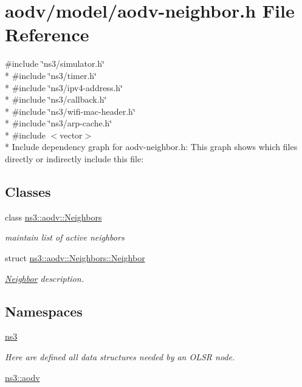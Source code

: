 \hypertarget{aodv-neighbor_8h}{}\section{aodv/model/aodv-\/neighbor.h File Reference}
\label{aodv-neighbor_8h}
{\ttfamily \#include \char`\"{}ns3/simulator.\+h\char`\"{}}\\*
{\ttfamily \#include \char`\"{}ns3/timer.\+h\char`\"{}}\\*
{\ttfamily \#include \char`\"{}ns3/ipv4-\/address.\+h\char`\"{}}\\*
{\ttfamily \#include \char`\"{}ns3/callback.\+h\char`\"{}}\\*
{\ttfamily \#include \char`\"{}ns3/wifi-\/mac-\/header.\+h\char`\"{}}\\*
{\ttfamily \#include \char`\"{}ns3/arp-\/cache.\+h\char`\"{}}\\*
{\ttfamily \#include $<$vector$>$}\\*
Include dependency graph for aodv-\/neighbor.h\+:
This graph shows which files directly or indirectly include this file\+:
\subsection*{Classes}
\begin{DoxyCompactItemize}
\item 
class \hyperlink{classns3_1_1aodv_1_1Neighbors}{ns3\+::aodv\+::\+Neighbors}
\begin{DoxyCompactList}\small\item\em maintain list of active neighbors \end{DoxyCompactList}\item 
struct \hyperlink{structns3_1_1aodv_1_1Neighbors_1_1Neighbor}{ns3\+::aodv\+::\+Neighbors\+::\+Neighbor}
\begin{DoxyCompactList}\small\item\em \hyperlink{structns3_1_1aodv_1_1Neighbors_1_1Neighbor}{Neighbor} description. \end{DoxyCompactList}\end{DoxyCompactItemize}
\subsection*{Namespaces}
\begin{DoxyCompactItemize}
\item 
 \hyperlink{namespacens3}{ns3}
\begin{DoxyCompactList}\small\item\em Here are defined all data structures needed by an O\+L\+SR node. \end{DoxyCompactList}\item 
 \hyperlink{namespacens3_1_1aodv}{ns3\+::aodv}
\end{DoxyCompactItemize}
